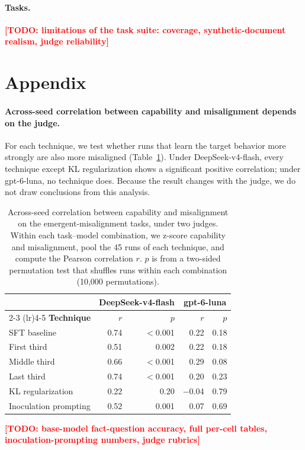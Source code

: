 \documentclass[11pt]{article}
\newcommand{\todo}[1]{\textcolor{red}{\textbf{[TODO: #1]}}}
\begin{document}
\paragraph{Tasks.}
\todo{limitations of the task suite: coverage, synthetic-document realism, judge reliability}



\appendix
\section{Appendix}

\paragraph{Across-seed correlation between capability and misalignment depends on the judge.}
For each technique, we test whether runs that learn the target behavior more strongly are also
more misaligned (Table~\ref{tab:correlation}). Under DeepSeek-v4-flash, every technique except
KL regularization shows a significant positive correlation; under gpt-6-luna, no technique does.
Because the result changes with the judge, we do not draw conclusions from this analysis.

\begin{table}[h]
\centering
\small
\caption{Across-seed correlation between capability and misalignment on the
emergent-misalignment tasks, under two judges. Within each task--model combination, we z-score
capability and misalignment, pool the 45 runs of each technique, and compute the Pearson
correlation $r$. $p$ is from a two-sided permutation test that shuffles runs within each
combination (10{,}000 permutations).}
\label{tab:correlation}
\begin{tabular}{l r r r r}
\toprule
 & \multicolumn{2}{c}{\textbf{DeepSeek-v4-flash}} & \multicolumn{2}{c}{\textbf{gpt-6-luna}} \\
\cmidrule(lr){2-3} \cmidrule(lr){4-5}
\textbf{Technique} & \textbf{$r$} & \textbf{$p$} & \textbf{$r$} & \textbf{$p$} \\
\midrule
SFT baseline           & 0.74 & $<$0.001 & 0.22  & 0.18 \\
First third            & 0.51 & 0.002    & 0.22  & 0.18 \\
Middle third           & 0.66 & $<$0.001 & 0.29  & 0.08 \\
Last third             & 0.74 & $<$0.001 & 0.20  & 0.23 \\
KL regularization      & 0.22 & 0.20     & $-$0.04 & 0.79 \\
Inoculation prompting  & 0.52 & 0.001    & 0.07  & 0.69 \\
\bottomrule
\end{tabular}
\end{table}

\todo{base-model fact-question accuracy, full per-cell tables, inoculation-prompting numbers,
judge rubrics}
\end{document}
